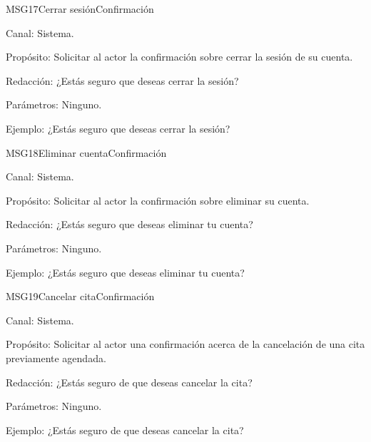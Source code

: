 \begin{mensaje}{MSG17}{Cerrar sesión}{Confirmación}
	\item[Canal:] Sistema.
    \item[Propósito:] Solicitar al actor la confirmación sobre cerrar la sesión de su cuenta.
    \item[Redacción:] ¿Estás seguro que deseas cerrar la sesión?
    \item[Parámetros:] Ninguno.
    \item[Ejemplo:] ¿Estás seguro que deseas cerrar la sesión?
\end{mensaje}

\begin{mensaje}{MSG18}{Eliminar cuenta}{Confirmación}
	\item[Canal:] Sistema.
    \item[Propósito:] Solicitar al actor la confirmación sobre eliminar su cuenta.
    \item[Redacción:] ¿Estás seguro que deseas eliminar tu cuenta?
    \item[Parámetros:] Ninguno.
    \item[Ejemplo:] ¿Estás seguro que deseas eliminar tu cuenta?
\end{mensaje}

\begin{mensaje}{MSG19}{Cancelar cita}{Confirmación}
	\item[Canal:] Sistema.
    \item[Propósito:] Solicitar al actor una confirmación acerca de la cancelación de una cita previamente agendada.
    \item[Redacción:] ¿Estás seguro de que deseas cancelar la cita?
    \item[Parámetros:] Ninguno.
    \item[Ejemplo:] ¿Estás seguro de que deseas cancelar la cita?
\end{mensaje}

